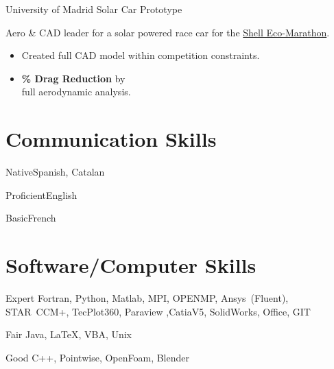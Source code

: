 \documentclass[fontsize=10pt]{tccv}
\begin{document}
\begin{eventlist}
     {University of Madrid}
     {Solar Car Prototype}

Aero \& CAD leader for a solar powered race car for the \href{http://www.shell.com/global/environment-society/ecomarathon.html}{Shell Eco-Marathon}.
\begin{itemize}
\itemsep -1pt
	\item Created full CAD model within competition constraints.
	\item \textbf{\% Drag Reduction} by \\full aerodynamic analysis.
\end{itemize}
\end{eventlist}

\section{Communication Skills}
\begin{factlist}
\item{Native}{Spanish, Catalan}
\item{Proficient}{English}
\item{Basic}{French}
\end{factlist}

\vspace{-20pt}
\section{Software/Computer Skills}
\begin{factlist}
\item{Expert}
     {Fortran, Python, Matlab, MPI, OPENMP, Ansys~(Fluent), STAR~CCM+, TecPlot360,
     Paraview ,CatiaV5, SolidWorks, Office, GIT}
\item{Fair}
     {Java, \LaTeX, VBA,  Unix}
\item{Good}
     {C++, Pointwise, OpenFoam, Blender}
\end{factlist}


\vspace{-20pt}
\end{document}
